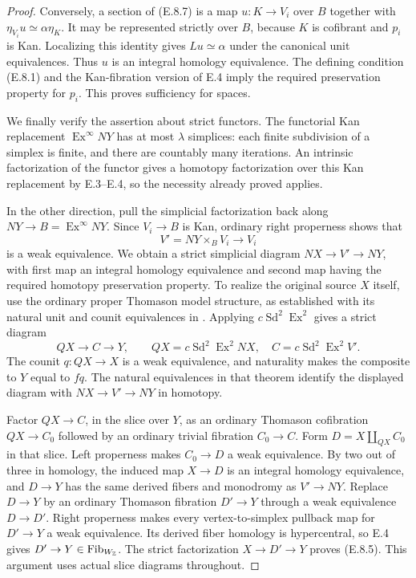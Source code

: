 \begin{proof}
Conversely, a section of (E.8.7) is a map $u:K\to V_i$ over $B$
together with
$\eta_{V_i}u\simeq\alpha\eta_K$. It may be represented strictly
over $B$, because $K$ is cofibrant and $p_i$ is Kan.
Localizing this identity gives $Lu\simeq\alpha$ under the
canonical unit equivalences. Thus $u$ is an integral homology
equivalence. The defining condition (E.8.1) and the
Kan-fibration version of E.4 imply the required preservation
property for $p_i$. This proves sufficiency for spaces.

We finally verify the assertion about strict functors. The
functorial Kan replacement $\operatorname{Ex}^{\infty}NY$ has
at most $\lambda$ simplices: each finite subdivision of a
simplex is finite, and there are countably many iterations.
An intrinsic factorization of the functor gives a homotopy
factorization over this Kan replacement by E.3--E.4, so the
necessity already proved applies.

In the other direction, pull the simplicial factorization back
along $NY\to B=\operatorname{Ex}^{\infty}NY$. Since $V_i\to B$
is Kan, ordinary right properness shows that
\[
                 V'=NY\times_BV_i\longrightarrow V_i
\]
is a weak equivalence. We obtain a strict simplicial diagram
$NX\to V'\to NY$, with first map an integral homology
equivalence and second map having the required homotopy
preservation property. To realize the original source $X$
itself, use the ordinary proper Thomason model structure,
as established with its natural unit and counit equivalences
in \cite[Theorem~5.2.12]{EH5Cisinski2006}. Applying
$c\operatorname{Sd}^2\operatorname{Ex}^2$ gives a strict diagram
\[
 QX\longrightarrow C\longrightarrow Y,\qquad
 QX=c\operatorname{Sd}^2\operatorname{Ex}^2NX,\quad
 C=c\operatorname{Sd}^2\operatorname{Ex}^2V'.
\]
The counit $q:QX\to X$ is a weak equivalence, and naturality
makes the composite to $Y$ equal to $fq$. The natural
equivalences in that theorem identify the displayed diagram
with $NX\to V'\to NY$ in homotopy.

Factor $QX\to C$, in the slice over $Y$, as an ordinary
Thomason cofibration $QX\to C_0$ followed by an ordinary trivial
fibration $C_0\to C$. Form
$D=X\amalg_{QX}C_0$ in that slice. Left properness makes
$C_0\to D$ a weak equivalence. By two out of three in homology,
the induced map $X\to D$ is an integral homology equivalence,
and $D\to Y$ has the same derived fibers and monodromy as
$V'\to NY$. Replace $D\to Y$ by an ordinary Thomason
fibration $D'\to Y$ through a weak equivalence $D\to D'$.
Right properness makes every vertex-to-simplex pullback map
for $D'\to Y$ a weak equivalence. Its derived fiber homology
is hypercentral, so E.4 gives $D'\to Y\in\operatorname{Fib}_{W_{\mathbb Z}}$.
The strict factorization $X\to D'\to Y$ proves (E.8.5).
This argument uses actual slice diagrams throughout.
\end{proof}

